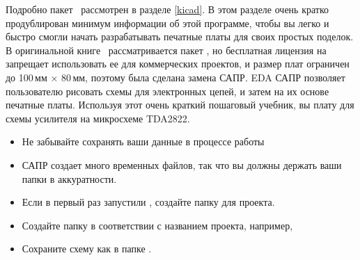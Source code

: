 \secdown

Подробно пакет \ рассмотрен в разделе \ref{kicad}. В этом разделе
очень кратко продублирован минимум информации об этой программе, чтобы вы легко и быстро смогли начать
разрабатывать печатные платы для своих простых поделок. В оригинальной книге
\cite{bcollis}\ рассматривается пакет , но бесплатная лицензия на
 запрещает использовать ее для коммерческих проектов, и размер плат
ограничен до 100\,мм $\times$ 80\,мм, поэтому была сделана замена САПР. EDA САПР
позволяет пользователю рисовать схемы для электронных цепей, и затем на их
основе  печатные
платы. Используя этот очень краткий пошаговый учебник, вы
 плату для схемы усилителя
на микросхеме TDA2822.








\begin{itemize}
  \item 
Не забывайте сохранять ваши данные в процессе работы
  \item 
САПР создает много временных файлов, так что вы должны держать ваши папки в
аккуратности.
  \item 
Если в первый раз запустили , создайте папку для проекта.
  \item 
Создайте папку в соответствии с названием проекта, например, 
  \item 
Сохраните схему как  в папке .
\end{itemize}

\secup
